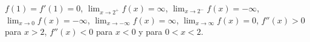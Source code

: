 \item $f(1) = f'(1) = 0$, $\lim_{x \to 2^+} f(x) = \infty$, $\lim_{x \to 2^-} f(x) = -\infty$, $\lim_{x \to 0} f(x) = -\infty$, $\lim_{x \to -\infty} f(x) = \infty$, $\lim_{x \to \infty} f(x) = 0$, $f''(x) > 0$ para $x > 2$, $f''(x) < 0$ para $x < 0$ y para $0 < x < 2$.
